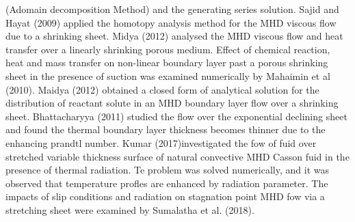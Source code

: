 \documentclass[a4paper,12pt]{report}
\begin{document}
{(Adomain decomposition Method) and the generating series solution. Sajid and Hayat (2009) applied the homotopy analysis method for the MHD viscous flow due to a shrinking sheet. Midya (2012) analysed the MHD viscous flow and heat transfer over a linearly shrinking porous medium. Effect of chemical reaction, heat and mass transfer on non-linear boundary layer past a porous shrinking sheet in the presence of suction was examined numerically by Mahaimin et al (2010). Maidya (2012) obtained a closed form of analytical solution for the distribution of reactant solute in an MHD boundary layer flow over a shrinking sheet. Bhattacharyya (2011) studied the flow over the exponential declining sheet and found the thermal boundary layer thickness becomes thinner due to the enhancing prandtl number.
Kumar (2017)investigated the fow of fuid over stretched variable thickness surface of natural convective MHD Casson fuid in the presence of thermal radiation. Te problem was solved numerically, and it was observed that temperature profles are enhanced by radiation parameter. The impacts of slip conditions and radiation on stagnation point MHD fow via a stretching sheet were examined by Sumalatha et al. (2018).

}
\end{document}
